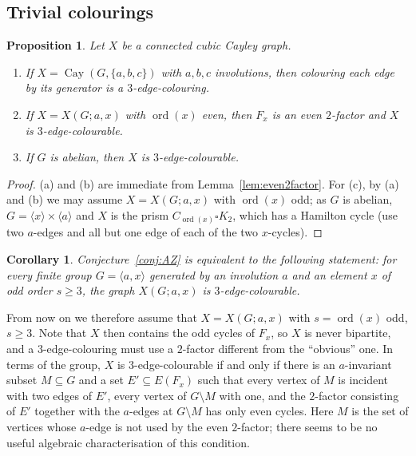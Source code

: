 \documentclass[11pt,a4paper]{article}
\newtheorem{proposition}[theorem]{Proposition}
\newtheorem{corollary}[theorem]{Corollary}
\theoremstyle{definition}
\theoremstyle{remark}
\newcommand{\Cay}{\operatorname{Cay}}
\newcommand{\ord}{\operatorname{ord}}
\newcommand{\X}[3]{X(#1;#2,#3)}
\begin{document}
\subsection{Trivial colourings}
\begin{proposition}\label{prop:trivial}
Let $X$ be a connected cubic Cayley graph.
\begin{enumerate}[label=\textup{(\alph*)}]
\item If $X=\Cay(G,\{a,b,c\})$ with $a,b,c$ involutions, then colouring each edge by its generator is a $3$-edge-colouring.
\item If $X=\X{G}{a}{x}$ with $\ord(x)$ even, then $F_x$ is an even $2$-factor and $X$ is $3$-edge-colourable.
\item If $G$ is abelian, then $X$ is $3$-edge-colourable.
\end{enumerate}
\end{proposition}
\begin{proof}
(a) and (b) are immediate from Lemma~\ref{lem:even2factor}.  For (c), by (a) and (b) we may assume $X=\X{G}{a}{x}$ with $\ord(x)$ odd; as $G$ is abelian, $G=\langle x\rangle\times\langle a\rangle$ and $X$ is the prism $C_{\ord(x)}\square K_2$, which has a Hamilton cycle (use two $a$-edges and all but one edge of each of the two $x$-cycles).
\end{proof}

\begin{corollary}\label{cor:reduction}
Conjecture~\ref{conj:AZ} is equivalent to the following statement: for every finite group $G=\langle a,x\rangle$ generated by an involution $a$ and an element $x$ of odd order $s\ge3$, the graph $\X{G}{a}{x}$ is $3$-edge-colourable.
\end{corollary}

From now on we therefore assume that $X=\X{G}{a}{x}$ with $s=\ord(x)$ odd, $s\ge 3$.  Note that $X$ then contains the odd cycles of $F_x$, so $X$ is never bipartite, and a $3$-edge-colouring must use a $2$-factor different from the ``obvious'' one.  In terms of the group, $X$ is $3$-edge-colourable if and only if there is an $a$-invariant subset $M\subseteq G$ and a set $E'\subseteq E(F_x)$ such that every vertex of $M$ is incident with two edges of $E'$, every vertex of $G\setminus M$ with one, and the $2$-factor consisting of $E'$ together with the $a$-edges at $G\setminus M$ has only even cycles.  Here $M$ is the set of vertices whose $a$-edge is not used by the even $2$-factor; there seems to be no useful algebraic characterisation of this condition.
\end{document}

